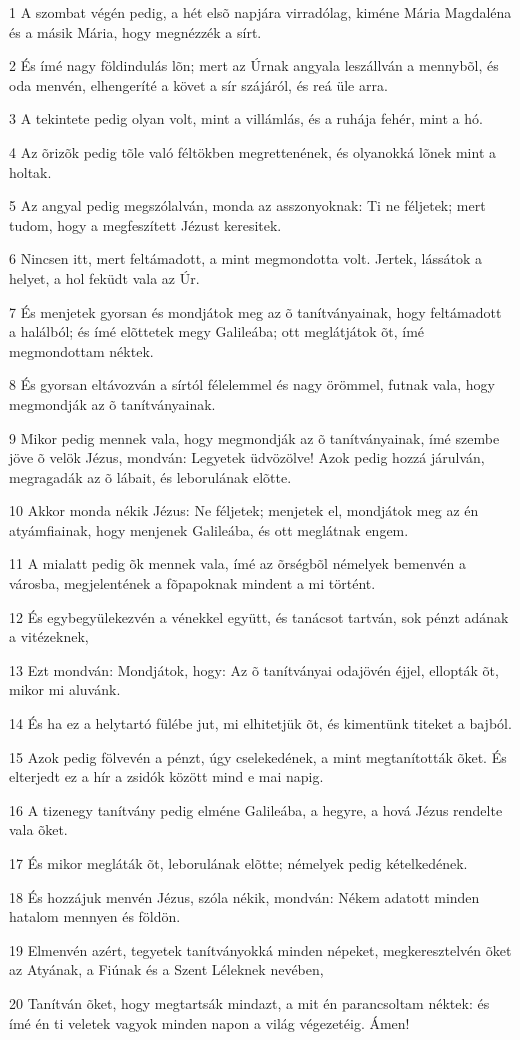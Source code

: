 \par 1 A szombat végén pedig, a hét elsõ napjára virradólag, kiméne Mária Magdaléna és a másik Mária, hogy megnézzék a sírt.
\par 2 És ímé nagy földindulás lõn; mert az Úrnak angyala leszállván a mennybõl, és oda menvén, elhengeríté a követ a sír szájáról, és reá üle arra.
\par 3 A tekintete pedig olyan volt, mint a villámlás, és a ruhája fehér, mint a hó.
\par 4 Az õrizõk pedig tõle való féltökben megrettenének, és olyanokká lõnek mint a holtak.
\par 5 Az angyal pedig megszólalván, monda az asszonyoknak: Ti ne féljetek; mert tudom, hogy a megfeszített Jézust keresitek.
\par 6 Nincsen itt, mert feltámadott, a mint megmondotta volt. Jertek, lássátok a helyet, a hol feküdt vala  az Úr.
\par 7 És menjetek gyorsan és mondjátok meg az õ tanítványainak, hogy feltámadott a halálból; és ímé elõttetek megy Galileába; ott meglátjátok õt, ímé megmondottam néktek.
\par 8 És gyorsan eltávozván a sírtól félelemmel és nagy örömmel, futnak vala, hogy megmondják az õ tanítványainak.
\par 9 Mikor pedig mennek vala, hogy megmondják az õ tanítványainak, ímé szembe jöve õ velök Jézus, mondván: Legyetek üdvözölve! Azok pedig hozzá járulván, megragadák az õ lábait, és leborulának elõtte.
\par 10 Akkor monda nékik Jézus: Ne féljetek; menjetek el, mondjátok meg az én atyámfiainak, hogy menjenek Galileába, és ott meglátnak engem.
\par 11 A mialatt pedig õk mennek vala, ímé az õrségbõl némelyek bemenvén a városba, megjelentének a fõpapoknak mindent a mi történt.
\par 12 És egybegyülekezvén a vénekkel együtt, és tanácsot tartván, sok pénzt adának a vitézeknek,
\par 13 Ezt mondván: Mondjátok, hogy: Az õ tanítványai odajövén éjjel, ellopták õt, mikor mi aluvánk.
\par 14 És ha ez a helytartó fülébe jut, mi elhitetjük õt, és kimentünk titeket a bajból.
\par 15 Azok pedig fölvevén a pénzt, úgy cselekedének, a mint megtanították õket. És elterjedt ez a hír a zsidók között mind e mai napig.
\par 16 A tizenegy tanítvány pedig elméne Galileába, a hegyre, a hová Jézus rendelte vala õket.
\par 17 És mikor megláták õt, leborulának elõtte; némelyek pedig kételkedének.
\par 18 És hozzájuk menvén Jézus, szóla nékik, mondván: Nékem adatott minden hatalom mennyen és földön.
\par 19 Elmenvén azért, tegyetek tanítványokká minden népeket, megkeresztelvén õket az Atyának, a Fiúnak és a Szent Léleknek nevében,
\par 20 Tanítván õket, hogy megtartsák mindazt, a mit én parancsoltam néktek: és ímé én ti veletek vagyok minden napon a világ végezetéig. Ámen!


